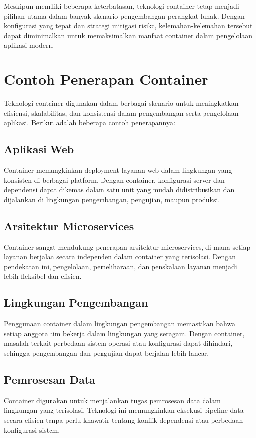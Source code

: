 Meskipun memiliki beberapa keterbatasan, teknologi container tetap menjadi pilihan utama dalam banyak skenario pengembangan perangkat lunak. Dengan konfigurasi yang tepat dan strategi mitigasi risiko, kelemahan-kelemahan tersebut dapat diminimalkan untuk memaksimalkan manfaat container dalam pengelolaan aplikasi modern.


\section{Contoh Penerapan Container}

Teknologi container digunakan dalam berbagai skenario untuk meningkatkan efisiensi, skalabilitas, dan konsistensi dalam pengembangan serta pengelolaan aplikasi. Berikut adalah beberapa contoh penerapannya:

\subsection{Aplikasi Web}
Container memungkinkan deployment layanan web dalam lingkungan yang konsisten di berbagai platform. Dengan container, konfigurasi server dan dependensi dapat dikemas dalam satu unit yang mudah didistribusikan dan dijalankan di lingkungan pengembangan, pengujian, maupun produksi.

\subsection{Arsitektur Microservices}
Container sangat mendukung penerapan arsitektur microservices, di mana setiap layanan berjalan secara independen dalam container yang terisolasi. Dengan pendekatan ini, pengelolaan, pemeliharaan, dan penskalaan layanan menjadi lebih fleksibel dan efisien.

\subsection{Lingkungan Pengembangan}
Penggunaan container dalam lingkungan pengembangan memastikan bahwa setiap anggota tim bekerja dalam lingkungan yang seragam. Dengan container, masalah terkait perbedaan sistem operasi atau konfigurasi dapat dihindari, sehingga pengembangan dan pengujian dapat berjalan lebih lancar.

\subsection{Pemrosesan Data}
Container digunakan untuk menjalankan tugas pemrosesan data dalam lingkungan yang terisolasi. Teknologi ini memungkinkan eksekusi pipeline data secara efisien tanpa perlu khawatir tentang konflik dependensi atau perbedaan konfigurasi sistem.

